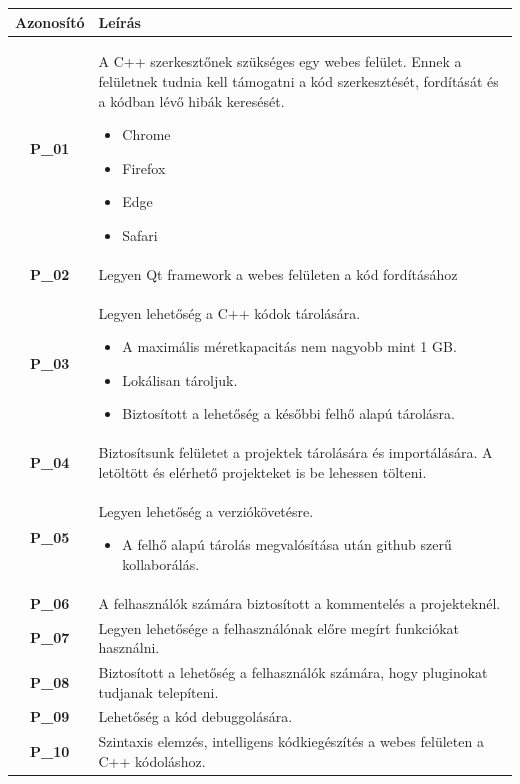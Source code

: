 \documentclass{article}
\begin{document}
\begin{longtable}{|c|p{14cm}|}
\hline
\textbf{Azonosító} & \textbf{Leírás}        \\ 
\hline
       \textbf{P\_01}  &  A C++ szerkesztőnek szükséges egy webes felület. Ennek a felületnek tudnia kell támogatni a kód szerkesztését, fordítását és a kódban lévő hibák keresését.
       \begin{itemize}
        \item Chrome
        \item Firefox
        \item Edge
        \item Safari
        \end{itemize} \\\hline
       \textbf{P\_02}  &  Legyen Qt framework a webes felületen a kód fordításához \\\hline
       \textbf{P\_03}  &  Legyen lehetőség a C++ kódok tárolására.
       \begin{itemize}
        \item A maximális méretkapacitás nem nagyobb mint 1 GB.
        \item Lokálisan tároljuk.
        \item Biztosított a lehetőség a későbbi felhő alapú tárolásra.
        \end{itemize} \\\hline
       \textbf{P\_04}  &  Biztosítsunk felületet a projektek tárolására és importálására. A letöltött és elérhető projekteket is be lehessen tölteni. \\\hline
       \textbf{P\_05}  &  Legyen lehetőség a verziókövetésre. 
       \begin{itemize}
        \item A felhő alapú tárolás megvalósítása után github szerű kollaborálás.
        \end{itemize} \\\hline
       \textbf{P\_06}  &  A felhasználók számára biztosított a kommentelés a projekteknél.\\\hline
       \textbf{P\_07}  &  Legyen lehetősége a felhasználónak előre megírt funkciókat használni. \\\hline
       \textbf{P\_08}  &  Biztosított a lehetőség a felhasználók számára, hogy pluginokat tudjanak telepíteni. \\\hline
       \textbf{P\_09}  &  Lehetőség a kód debuggolására.\\\hline
       \textbf{P\_10}  &  Szintaxis elemzés, intelligens kódkiegészítés a webes felületen a C++ kódoláshoz. \\\hline

\end{longtable}
\end{document}

